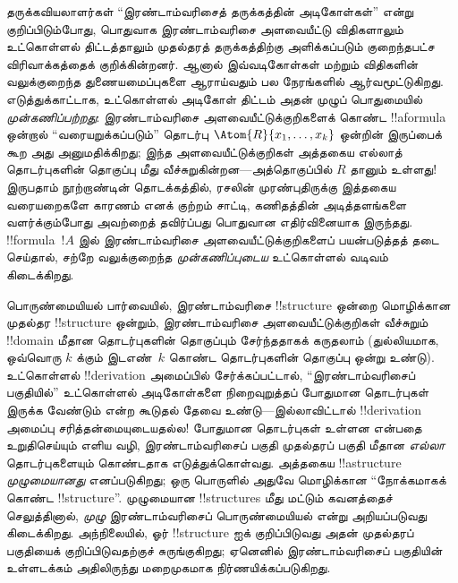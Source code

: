 \documentclass[../../../include/open-logic-section]{subfiles}
\begin{document}
தருக்கவியலாளர்கள் ``இரண்டாம்வரிசைத் தருக்கத்தின் அடிகோள்கள்'' என்று
குறிப்பிடும்போது, பொதுவாக இரண்டாம்வரிசை அளவையீட்டு விதிகளாலும்
உட்கொள்ளல் திட்டத்தாலும் முதல்தரத் தருக்கத்திற்கு அளிக்கப்படும்
குறைந்தபட்ச விரிவாக்கத்தைக் குறிக்கின்றனர். ஆனால் இவ்வடிகோள்கள் மற்றும்
விதிகளின் வலுக்குறைந்த துணையமைப்புகளை ஆராய்வதும் பல நேரங்களில்
ஆர்வமூட்டுகிறது. எடுத்துக்காட்டாக, உட்கொள்ளல் அடிகோள் திட்டம் அதன் முழுப்
பொதுமையில் \emph{முன்கணிப்பற்றது}: இரண்டாம்வரிசை அளவையீட்டுக்குறிகளைக்
கொண்ட !!a{formula} ஒன்றால் ``வரையறுக்கப்படும்''
தொடர்பு $\Atom{R}{x_1, \dots, x_k}$ ஒன்றின் இருப்பைக் கூற அது
அனுமதிக்கிறது; இந்த அளவையீட்டுக்குறிகள் அத்தகைய எல்லாத் தொடர்புகளின்
தொகுப்பு மீது வீச்சுறுகின்றன---அத்தொகுப்பில் $R$ தானும் உள்ளது!{}
இருபதாம் நூற்றாண்டின் தொடக்கத்தில், ரசலின் முரண்புதிருக்கு இத்தகைய
வரையறைகளே காரணம் எனக் குற்றம் சாட்டி, கணிதத்தின் அடித்தளங்களை
வளர்க்கும்போது அவற்றைத் தவிர்ப்பது பொதுவான எதிர்வினையாக இருந்தது.
!!{formula}~$!A$ இல் இரண்டாம்வரிசை அளவையீட்டுக்குறிகளைப் பயன்படுத்தத்
தடை செய்தால், சற்றே வலுக்குறைந்த {\em முன்கணிப்புடைய} உட்கொள்ளல் வடிவம்
கிடைக்கிறது.

பொருண்மையியல் பார்வையில், இரண்டாம்வரிசை !!{structure} ஒன்றை மொழிக்கான
முதல்தர !!{structure} ஒன்றும், இரண்டாம்வரிசை அளவையீட்டுக்குறிகள்
வீச்சுறும் !!{domain} மீதான தொடர்புகளின் தொகுப்பும் சேர்ந்ததாகக்
கருதலாம் (துல்லியமாக, ஒவ்வொரு $k$ க்கும் இடஎண்~$k$ கொண்ட தொடர்புகளின்
தொகுப்பு ஒன்று உண்டு). உட்கொள்ளல் !!{derivation} அமைப்பில்
சேர்க்கப்பட்டால், ``இரண்டாம்வரிசைப் பகுதியில்'' உட்கொள்ளல் அடிகோள்களை
நிறைவுறுத்தப் போதுமான தொடர்புகள் இருக்க வேண்டும் என்ற கூடுதல் தேவை
உண்டு---இல்லாவிட்டால் !!{derivation} அமைப்பு சரித்தன்மையுடையதல்ல!{}
போதுமான தொடர்புகள் உள்ளன என்பதை உறுதிசெய்யும் எளிய வழி,
இரண்டாம்வரிசைப் பகுதி முதல்தரப் பகுதி மீதான \emph{எல்லா} தொடர்புகளையும்
கொண்டதாக எடுத்துக்கொள்வது. அத்தகைய !!a{structure}
\emph{முழுமையானது} எனப்படுகிறது; ஒரு பொருளில் அதுவே மொழிக்கான
``நோக்கமாகக் கொண்ட !!{structure}''. முழுமையான !!{structure}s மீது மட்டும்
கவனத்தைச் செலுத்தினால், \emph{முழு} இரண்டாம்வரிசைப் பொருண்மையியல்
என்று அறியப்படுவது கிடைக்கிறது. அந்நிலையில், ஓர் !!{structure} ஐக்
குறிப்பிடுவது அதன் முதல்தரப் பகுதியைக் குறிப்பிடுவதற்குச் சுருங்குகிறது;
ஏனெனில் இரண்டாம்வரிசைப் பகுதியின் உள்ளடக்கம் அதிலிருந்து மறைமுகமாக
நிர்ணயிக்கப்படுகிறது.
\end{document}
